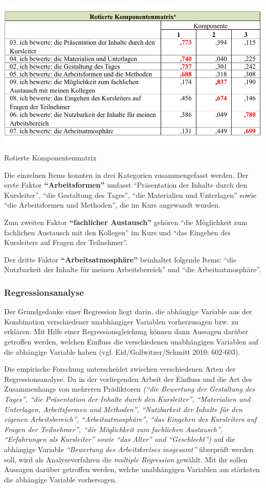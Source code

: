 \documentclass[12pt,a4paper]{article}
\begin{document}
\begin{table}[!ht]
\includegraphics[scale=0.84]{tab7.pdf}
\caption{Rotierte Komponentenmatrix}
\label{tab3}
\end{table}
\FloatBarrier

Die einzelnen Items konnten in drei Kategorien zusammengefasst werden. 	
Der erste Faktor \textbf{"`Arbeitsformen"'} umfasst "`Präsentation der Inhalte durch den Kursleiter"', "`die Gestaltung des Tages"', "`die Materialien und Unterlagen"' sowie "`die Arbeitsformen und Methoden"', die im Kurs angewandt wurden.

Zum zweiten Faktor \textbf{"`fachlicher Austausch"'} gehören "`die Möglichkeit zum fachlichen Austausch mit den Kollegen"' im Kurs und "`das Eingehen des Kursleiters auf Fragen der Teilnehmer"'.

Der dritte Faktor \textbf{"`Arbeitsatmosphäre"' }beinhaltet folgende Items: "`die Nutzbarkeit der Inhalte für meinen Arbeitsbereich"' und "`die Ar\-beits\-at\-mos\-phä\-re"'.

\subsubsection{Regressionsanalyse}

Der Grundgedanke einer Regression liegt darin, die abhängige Variable aus der Kombination verschiedener unabhängiger Variablen vorherzusagen bzw. zu erklären. Mit Hilfe einer Regressionsgleichung können dann Aussagen darüber getroffen werden, welchen Einfluss die verschiedenen unabhängigen Variablen auf die abhängige Variable haben (vgl. Eid/Gollwitzer/Schmitt 2010: 602-603). 

Die empirische Forschung unterscheidet zwischen verschiedenen Arten der Regressionsanalyse. Da in der vorliegenden Arbeit der Einfluss und die Art des Zusammenhangs von mehreren Prädiktoren \textit{("`die Bewertung der Gestaltung des Tages"', "`die Präsentation der Inhalte durch den Kursleiter"', "`Materialien und Unterlagen, Arbeitsformen und Methoden"', "`Nutzbarkeit der Inhalte für den eigenen Arbeitsbereich"', "`Arbeitsatmosphäre"', "`das Eingehen des Kursleiters auf Fragen der Teilnehmer"', "`die Möglichkeit zum fachlichen Austausch"', "`Erfahrungen als Kursleiter"' sowie "`das Alter"' und "`Geschlecht"')} auf die abhängige Variable \textit{"`Bewertung des Arbeitskreises insgesamt"'} überprüft werden soll, wird als Analyseverfahren die \textit{multiple Regression} gewählt. Mit ihr sollen Aussagen darüber getroffen werden, welche unabhängigen Variablen am stärksten die abhängige Variable vorhersagen.
\end{document}
